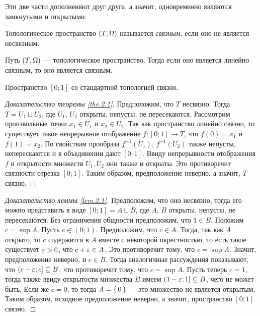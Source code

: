 \documentclass[main]{subfiles}
\begin{document}
\begin{remark}
	Эти две части дополненяют друг друга, а значит, одновременно являются замкнутыми и открытыми.
\end{remark}

\begin{definition}
	Топологическое пространство $ (T, \Omega) $ называется \emph{связным}, если оно не является несвязным.
\end{definition}

\begin{theorem} \label{the.2.1}
	Путь $ (T, \Omega) $ --- топологическое пространство. Тогда если оно является линейно связным, то оно является связным.
\end{theorem}

\begin{lemma} \label{lem.2.1}
	Пространство $[0; 1]$ со стандартной топологией связно.
\end{lemma}

\begin{proof}[Доказательство теоремы \ref{the.2.1}]
	Предположим, что $ T $ несвязно. Тогда $ T = U_1 \sqcup U_2 $, где $ U_1 $, $ U_2 $ открыты, непусты, не пересекаются.
	Рассмотрим произвольные точки $ x_1 \in U_1 $ и $ x_2 \in U_2 $. Так как пространство линейно связно, то
	существует такое непрерывное отображение $ f \colon [0; 1] \to T $, что $ f(0) = x_1 $ и $ f(1) = x_2 $.
	По свойствам прообраза $ f^{-1}(U_1) $, $ f^{-1}(U_2) $ также непусты, неперескаются и в объединении дают
	$[ 0; 1] $. Ввиду непрерывности отображения $ f $ и открытости множеств $ U_1, U_2 $ они также и открыты.
	Это противоречит связности отрезка $ [0; 1] $. Таким образом, предположение неверно, а значит, $ T $ связно.
\end{proof}

\begin{proof}[Доказательство леммы \ref{lem.2.1}] Предположим, что оно несвязно, тогда его можно представить в виде
	$ [0; 1] = A \sqcup B $, где $ A $, $ B $ открыты, непусты, не пересекаются. Без ограничения общности предположим,
	что $ 1 \in B $. Положим $ c = \sup A $. Пусть $ c \in (0; 1) $. Предположим, что $ c \in A $.
	Тогда, так как $ A $ открыто, то $ c $ содержится в $ A $ вместе с некоторой окрестностью,
	то есть такое существует $ \varepsilon > 0 $, что $ c + \varepsilon \in A $. Это противоречит тому, что $ c = \sup A $.
	Значит, предположение неверно, и $ c \in B $. Тогда аналогичные рассуждения показывают, что
	$ (c - \varepsilon; c] \subseteq B $, что противоречит тому, что $ c = \sup A $. Пусть теперь $ c = 1 $, тогда также ввиду
	открытости множества $ B $ имеем $ (1 - \varepsilon; 1] \subseteq B $, чего не может быть. Если же $ c = 0 $, то тогда
	$ A = \left\{\,0\,\right\} $ --- это множество не является открытым.	Таким образом, исходное предположение неверно,
	а значит, пространство $ [0; 1] $ связно.
\end{proof}
\end{document}

